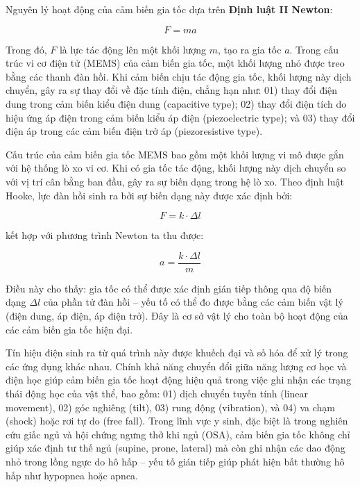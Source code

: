 Nguyên lý hoạt động của cảm biến gia tốc dựa trên 
\textbf{Định luật II Newton}:

\begin{equation}
F = ma
\end{equation}

Trong đó, $F$ là lực tác động lên một khối lượng $m$, tạo ra gia tốc $a$. Trong cấu trúc vi cơ điện tử (MEMS) của cảm biến gia tốc, một khối lượng nhỏ được treo bằng các thanh đàn hồi. Khi cảm biến chịu tác động gia tốc, khối lượng này dịch chuyển, gây ra sự thay đổi về đặc tính điện, chẳng hạn như: 01) thay đổi điện dung trong cảm biến kiểu điện dung (capacitive type); 02) thay đổi điện tích do hiệu ứng áp điện trong cảm biến kiểu áp điện (piezoelectric type); và 03) thay đổi điện áp trong các cảm biến điện trở áp (piezoresistive type).

Cấu trúc của cảm biến gia tốc MEMS bao gồm một khối lượng vi mô được 
gắn với hệ thống lò xo vi cơ. Khi có gia tốc tác động, 
khối lượng này dịch chuyển so với vị trí cân bằng ban đầu, 
gây ra sự biến dạng trong hệ lò xo. 
Theo định luật Hooke, lực đàn hồi sinh ra bởi sự biến dạng này 
được xác định bởi:

\begin{equation}
F = k \cdot \Delta l
\end{equation}

kết hợp với phương trình Newton ta thu được:

\begin{equation}
a = \frac{k \cdot \Delta l}{m}
\end{equation}

Điều này cho thấy: gia tốc có thể được xác định gián tiếp thông qua 
độ biến dạng $\Delta l$ của phần tử đàn hồi – yếu tố có thể đo được 
bằng các cảm biến vật lý (điện dung, áp điện, áp điện trở). 
Đây là cơ sở vật lý cho toàn bộ hoạt động của các cảm biến gia 
tốc hiện đại.

Tín hiệu điện sinh ra từ quá trình này được khuếch đại và số hóa để xử lý trong các 
ứng dụng khác nhau. Chính khả năng chuyển đổi giữa năng lượng 
cơ học và điện học giúp cảm biến gia tốc hoạt động hiệu quả 
trong việc ghi nhận các trạng thái động học của vật thể, 
bao gồm: 01) dịch chuyển tuyến tính (linear movement), 
02) góc nghiêng (tilt), 03) rung động (vibration), 
và 04) va chạm (shock) hoặc rơi tự do (free fall).
Trong lĩnh vực y sinh, đặc biệt là trong nghiên cứu giấc ngủ và 
hội chứng ngưng thở khi ngủ (OSA), cảm biến gia tốc không chỉ 
giúp xác định tư thế ngủ (supine, prone, lateral) mà còn 
ghi nhận các dao động nhỏ trong lồng ngực do hô hấp – 
yếu tố gián tiếp giúp phát hiện bất thường hô hấp như 
hypopnea hoặc apnea.

